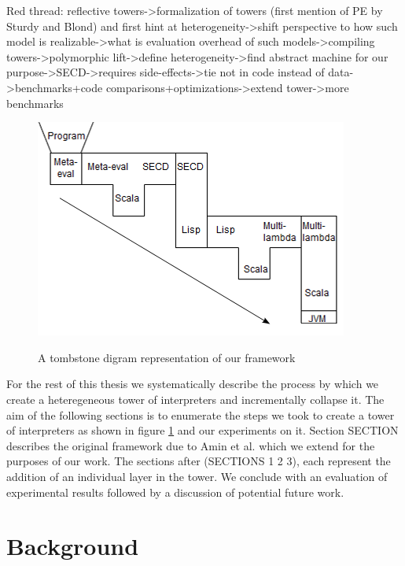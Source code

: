 \documentclass[fleqn]{article}
\theoremstyle{definition}
\begin{document}
Red thread:
reflective towers->formalization of towers (first mention of PE by Sturdy and Blond) and first hint at heterogeneity->shift perspective to how such model is realizable->what is evaluation overhead of such models->compiling towers->polymorphic lift->define heterogeneity->find abstract machine for our purpose->SECD->requires side-effects->tie not in code instead of data->benchmarks+code comparisons+optimizations->extend tower->more benchmarks

\begin{figure}[t]
	\centering
	\includegraphics[scale=2]{tombstone_tower.png}
	\label{fig:tombstone}
	\caption{A tombstone digram representation of our framework}
\end{figure}

For the rest of this thesis we systematically describe the process by which we create a heteregeneous tower of interpreters and incrementally collapse it. The aim of the following sections is to enumerate the steps we took to create a tower of interpreters as shown in figure \ref{fig:tombstone} and our experiments on it. Section SECTION describes the original framework due to Amin et al. \cite{amin2017collapsing} which we extend for the purposes of our work. The sections after (SECTIONS 1 2 3), each represent the addition of an individual layer in the tower. We conclude with an evaluation of experimental results followed by a discussion of potential future work.

\section{Background}
\end{document}
